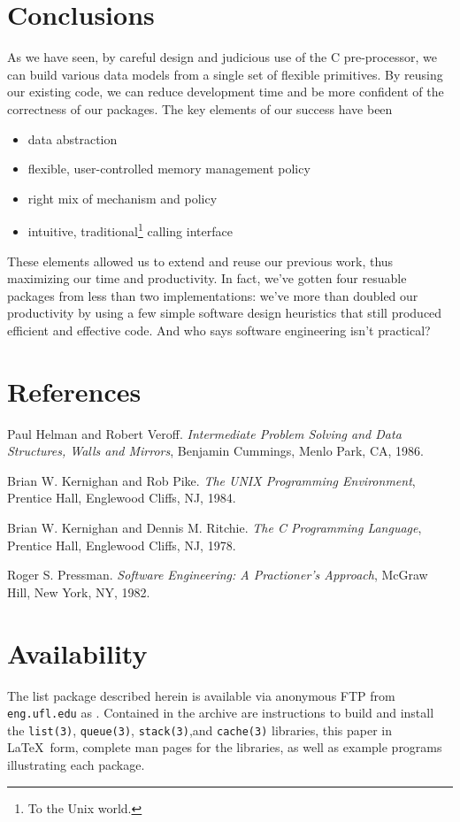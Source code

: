 \documentclass[fullpage,11pt]{article}
\begin{document}
\section{Conclusions}
As we have seen, by careful design and judicious use of the C pre-processor,
we can build various data models from a single set of flexible primitives.  By
reusing our existing code, we can reduce development time and be more
confident of the correctness of our packages.  The key elements of our success
have been
\begin{itemize}
	\item data abstraction
	\item flexible, user-controlled memory management policy
	\item right mix of mechanism and policy
	\item intuitive, traditional\footnote{To the Unix world.} calling
	      interface
\end{itemize}

These elements allowed us to extend and reuse our previous work, thus
maximizing our time and productivity.  In fact, we've gotten four resuable
packages from less than two implementations: we've more than doubled our
productivity by using a few simple software design heuristics that still
produced efficient and effective code.  And who says software engineering
isn't practical?

\newpage
\appendix
{}
\section{References}
\begin{list}{[]}{}
\item
	Paul Helman and Robert Veroff.
	{\em Intermediate Problem Solving and Data Structures, Walls
		and Mirrors},
	Benjamin Cummings, Menlo Park, CA,
	1986.
\item
	Brian W. Kernighan and Rob Pike.
	{\em The UNIX Programming Environment},
	Prentice Hall, Englewood Cliffs, NJ,
	1984. 
\item
	Brian W. Kernighan and Dennis M. Ritchie.
	{\em The C Programming Language},
	Prentice Hall, Englewood Cliffs, NJ,
	1978.
\item
	Roger S. Pressman.
	{\em Software Engineering: A Practioner's Approach},
	McGraw Hill, New York, NY,
	1982.
\end{list}

\section{Availability}
The list package described herein is available via anonymous FTP from {\tt
eng.ufl.edu} as .  Contained in the archive are
instructions to build and install the {\tt list(3)}, {\tt queue(3)},
{\tt stack(3)},and {\tt cache(3)} libraries, this paper in \LaTeX \ form,
complete man pages for the libraries, as well as example programs illustrating
each package.
\end{document}
